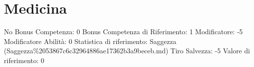 \section{Medicina}\label{medicina}

\begin{description}
\tightlist
\item[Tags: ABI]
No Bonus Competenza: 0 Bonus Competenza di Riferimento: 1 Modificatore:
-5 Modificatore Abilità: 0 Statistica di riferimento: Saggezza
(Saggezza\%2053867c6c32964886ae17362b3a9beceb.md) Tiro Salvezza: -5
Valore di riferimento: 0
\end{description}
